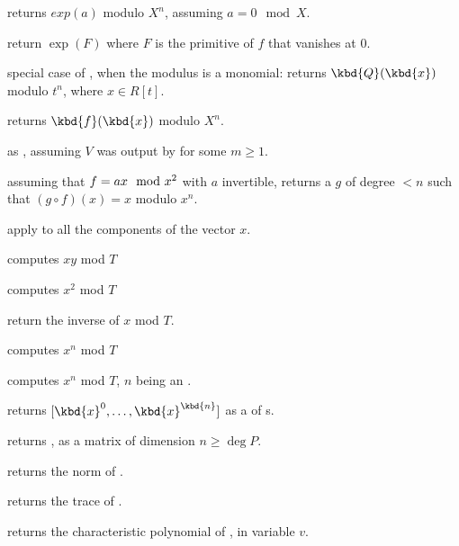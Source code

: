  returns $exp(a)$ modulo $X^n$, assuming
$a = 0 \mod{X}$.

 return $\exp(F)$
where $F$ is the primitive of $f$ that vanishes at $0$.

 special case of
, when the modulus is a monomial:
returns $\kbd{Q}(\kbd{x})$ modulo $t^n$, where $x \in R[t]$.

 returns $\kbd{f}(\kbd{x})$ modulo
$X^n$.

 as ,
assuming $V$ was output by  for some $m\geq 1$.

 assuming that $f = a\*x \mod{x^2}$
with $a$ invertible, returns a  $g$ of degree $< n$ such that $(g
\circ f)(x) = x$ modulo $x^n$.


 apply 
to all the components of the vector $x$.


 computes $xy$ mod $T$

 computes $x^2$ mod $T$

 return the inverse of $x$ mod $T$.

 computes $x^n$ mod $T$

 computes $x^n$ mod $T$,
$n$ being an .

 returns $[\kbd{x}^0,
\dots, \kbd{x}^\kbd{n}]$ as a  of s.

 returns
, as a matrix of dimension $n \geq \deg P$.

 returns the norm of .

 returns the trace of .

 returns the characteristic
polynomial of , in variable $v$.

